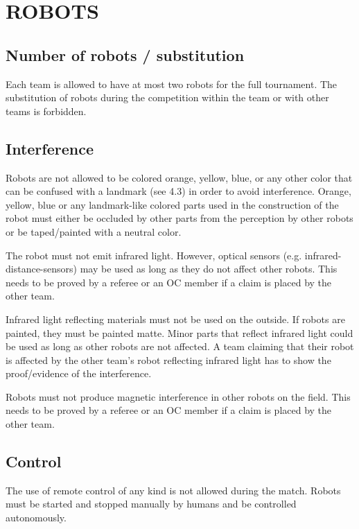 \documentclass{article}
\begin{document}
\section{ROBOTS\label{ref-018}}

\subsection{ Number of robots / substitution \label{ref-019}}

Each team is allowed to have at most two robots for the full tournament. The
substitution of robots during the competition within the team or with other
teams is forbidden.

\subsection{ Interference \label{ref-020}}

Robots are not allowed to be colored orange, yellow, blue, or any other color
that can be confused with a landmark (see 4.3) in order to avoid interference.
Orange, yellow, blue or any landmark-like colored parts used in the
construction of the robot must either be occluded by other parts from the
perception by other robots or be taped/painted with a neutral color.

The robot must not emit infrared light. However, optical sensors (e.g.
infrared-distance-sensors) may be used as long as they do not affect other
robots. This needs to be proved by a referee or an OC member if a claim is
placed by the other team.

Infrared light reflecting materials must not be used on the outside. If robots
are painted, they must be painted matte. Minor parts that reflect infrared
light could be used as long as other robots are not affected. A team claiming
that their robot is affected by the other team's robot reflecting infrared
light has to show the proof/evidence of the interference.

Robots must not produce magnetic interference in other robots on the field.
This needs to be proved by a referee or an OC member if a claim is placed by
the other team.

\subsection{ Control \label{ref-021}}

The use of remote control of any kind is not allowed during the match. Robots
must be started and stopped manually by humans and be controlled autonomously.
\end{document}
